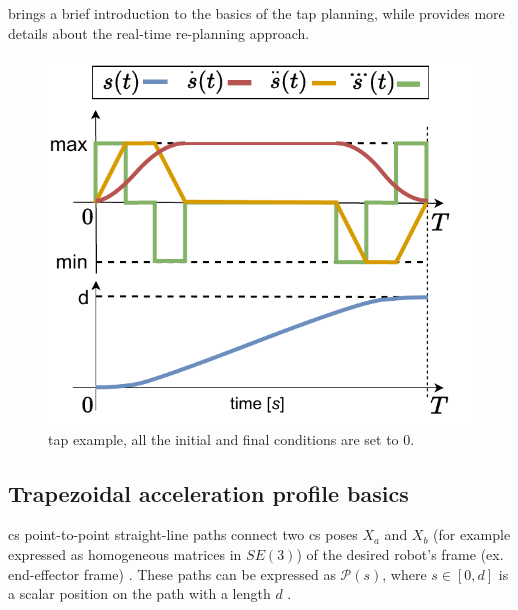  brings a brief introduction to the basics of the \gls{tap} planning,
while  provides more details about the real-time re-planning approach. 
\begin{figure}
    \vspace{0cm}
    \centering
    \includegraphics[width=\linewidth]{Papers/imgs/tap_profile.pdf}
    \caption{\gls{tap} example, all the initial and final conditions are set to 0.}
    \label{fig:tap_profile}
\end{figure}

\subsection{Trapezoidal acceleration profile basics}
\label{ch:tap_basics}

\gls{cs} point-to-point straight-line paths connect two \gls{cs} poses $X_a$ and $X_b$ (for example expressed as homogeneous matrices in $SE(3)$) of the desired robot's frame (ex. end-effector frame) \cite[Chapter 9.2.1]{modernrobotics}. These paths can be expressed as $\mathscr{P}(s)$, where $s\in\left[0,d\right]$ is a scalar position on the path with a length $d$ \cite{Constantinescu2000,Pfeiffer1987}. 

